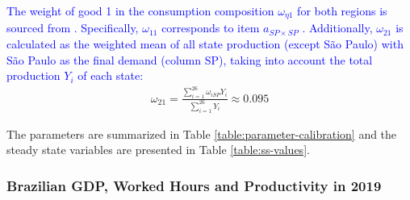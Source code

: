\documentclass[../thesis.tex]{subfiles}
\begin{document}
\textcolor{blue}{The weight of good 1 in the consumption composition $\omega_{\eta 1}$ for both regions is sourced from \textcite[Table 3, p.442]{haddad_matriz_2017}. Specifically, $\omega_{11}$ corresponds to item $a_{SP\times SP}$ \label{eq:omega-e1}. Additionally, $\omega_{21}$ is calculated as the weighted mean of all state production (except São Paulo) with São Paulo as the final demand (column SP), taking into account the total production $Y_{i}$ of each state:}
\begin{align}
	\omega_{21} = \frac{\sum_{i=1}^{26} \omega_{iSP} Y_i}{\sum_{i=1}^{26} Y_i} \approx 0.095 \label{eq:omega-e2}
\end{align}

The parameters are summarized in Table \eqref{table:parameter-calibration} and the steady state variables are presented in Table \eqref{table:ss-values}.


\newpage


\subsubsection{Brazilian GDP, Worked Hours and Productivity in 2019}

\vspace*{0.5cm}
\end{document}
